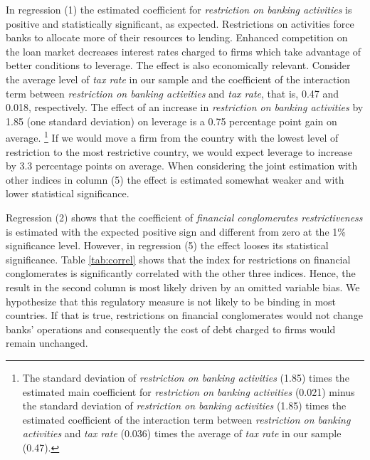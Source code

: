 \documentclass[12pt]{article}
\begin{document}
	  In regression (1) the estimated coefficient for \textit{restriction on banking activities}  is positive and statistically significant, as expected. Restrictions on activities force banks to allocate more of their resources to lending. Enhanced competition on the loan market decreases interest rates charged to firms which take advantage of better conditions to leverage. The effect is also economically relevant. Consider the average level of \textit{tax rate} in our sample and the coefficient of the interaction term between \textit{restriction on banking activities} and \textit{tax rate}, that is, 0.47 and 0.018, respectively. The effect of an increase in \textit{restriction on banking activities} by 1.85 (one standard deviation) on leverage is a 0.75 percentage point gain on average. \footnote{The standard deviation of \textit{restriction on banking activities} (1.85) times the estimated main coefficient for \textit{restriction on banking activities} (0.021) minus the standard deviation of \textit{restriction on banking activities} (1.85) times the estimated coefficient of the interaction term between \textit{restriction on banking activities} and \textit{tax rate} (0.036) times the average of \textit{tax rate} in our sample (0.47).} If we would move a firm from the country with the lowest level of restriction to the most restrictive country, we would expect leverage to increase by 3.3 percentage points on average.  When considering the joint estimation with other indices in column (5) the effect is estimated somewhat weaker and with lower statistical significance.
	
	  Regression (2) shows that the coefficient of \textit{financial conglomerates restrictiveness} is estimated with the expected positive sign and different from zero at the 1\% significance level. However, in regression (5) the effect looses its statistical significance. Table \ref{tab:correl} shows that the index for restrictions on financial conglomerates is significantly correlated with the other three indices. Hence, the result in the second column is most likely driven by an omitted variable bias. We hypothesize that this regulatory measure is not likely to be binding in most countries. If that is true, restrictions on financial conglomerates would not change banks' operations and consequently the cost of debt charged to firms would remain unchanged.
	
\end{document}
